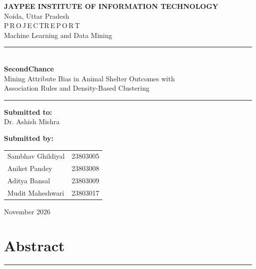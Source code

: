 \documentclass[11pt,a4paper]{article}
\begin{document}
\pagestyle{empty}

\begin{center}
\vspace*{1.2cm}
{\color{jiitblue}\Large\bfseries JAYPEE INSTITUTE OF INFORMATION TECHNOLOGY}\\[4pt]
{\large Noida, Uttar Pradesh}\\[2.0cm]

{\large P\,R\,O\,J\,E\,C\,T\quad R\,E\,P\,O\,R\,T}\\[4pt]
{\large Machine Learning and Data Mining}\\[1.0cm]

\rule{0.62\textwidth}{0.8pt}\\[0.7cm]
{\color{jiitblue}\Huge\bfseries SecondChance}\\[0.7cm]
{\large Mining Attribute Bias in Animal Shelter Outcomes with\\
Association Rules and Density-Based Clustering}\\[0.6cm]
\rule{0.62\textwidth}{0.8pt}

\vfill
\begin{minipage}[t]{0.45\textwidth}
\raggedright
{\color{jiitblue}\bfseries Submitted to:}\\[6pt]
Dr. Ashish Mishra
\end{minipage}
\hfill
\begin{minipage}[t]{0.45\textwidth}
\raggedleft
{\color{jiitblue}\bfseries Submitted by:}\\[6pt]
\begin{tabular}{@{}lr@{}}
Sambhav Ghildiyal & 23803005 \\
Aniket Pandey & 23803008 \\
Aditya Bansal & 23803009 \\
Mudit Maheshwari & 23803017 \\
\end{tabular}
\end{minipage}

\vspace{1.2cm}
November 2026
\end{center}

\newpage
\pagestyle{plain}
\setcounter{page}{1}
\tableofcontents
\newpage

\section*{Abstract}
\rule{\textwidth}{0.6pt}\vspace{4pt}
\end{document}

